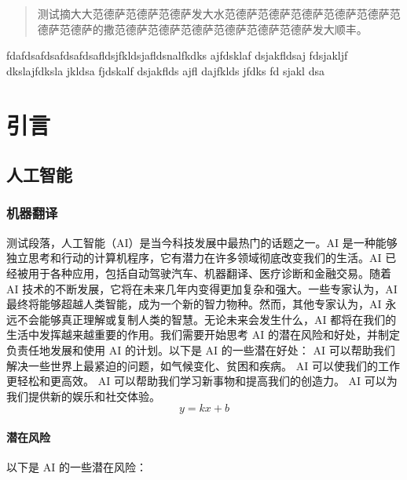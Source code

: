 \documentclass[engineeringmaster]{hquThesis}
\begin{document}
\makecover
\frontmatter
\begin{abstract}
    测试摘大大范德萨范德萨范德萨发大水范德萨范德萨范德萨范德萨范德萨范德萨范德萨的撒范德萨范德萨范德萨范德萨范德萨范德萨发大顺丰。\par
\end{abstract}
\begin{abstractEn}
    fdafdsafdsafdsafdsafldsjfkldsjafldsnalfkdks ajfdsklaf dsjakfldsaj fdsjakljf dkslajfdksla jkldsa fjdskalf dsjakflds ajfl dajfklds jfdks fd sjakl dsa\par
\end{abstractEn}
\tableofcontents

\mainmatter

\chapter{引言}
\section{人工智能}
\subsection{机器翻译}
测试段落，人工智能（AI）是当今科技发展中最热门的话题之一。AI 是一种能够独立思考和行动的计算机程序，它有潜力在许多领域彻底改变我们的生活。AI 已经被用于各种应用，包括自动驾驶汽车、机器翻译、医疗诊断和金融交易。随着 AI 技术的不断发展，它将在未来几年内变得更加复杂和强大。一些专家认为，AI 最终将能够超越人类智能，成为一个新的智力物种。然而，其他专家认为，AI 永远不会能够真正理解或复制人类的智慧。无论未来会发生什么，AI 都将在我们的生活中发挥越来越重要的作用。我们需要开始思考 AI 的潜在风险和好处，并制定负责任地发展和使用 AI 的计划。以下是 AI 的一些潜在好处：
AI 可以帮助我们解决一些世界上最紧迫的问题，如气候变化、贫困和疾病。
AI 可以使我们的工作更轻松和更高效。
AI 可以帮助我们学习新事物和提高我们的创造力。
AI 可以为我们提供新的娱乐和社交体验。
\begin{equation}
y = kx + b
\end{equation}

\subsubsection{潜在风险}
以下是 AI 的一些潜在风险：
\end{document}
